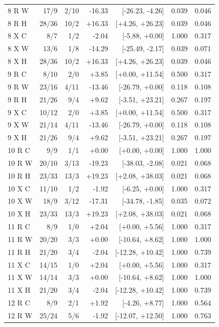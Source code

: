 \begin{longtable}{lrrrrrr}
8 R W & 17/9 & 2/10 & -16.33 & [-26.23, -4.26] & 0.039 & 0.046\\
8 R H & 28/36 & 10/2 & +16.33 & [+4.26, +26.23] & 0.039 & 0.046\\
8 X C & 8/7 & 1/2 & -2.04 & [-5.88, +0.00] & 1.000 & 0.317\\
8 X W & 13/6 & 1/8 & -14.29 & [-25.49, -2.17] & 0.039 & 0.071\\
8 X H & 28/36 & 10/2 & +16.33 & [+4.26, +26.23] & 0.039 & 0.046\\
9 R C & 8/10 & 2/0 & +3.85 & [+0.00, +11.54] & 0.500 & 0.317\\
9 R W & 23/16 & 4/11 & -13.46 & [-26.79, +0.00] & 0.118 & 0.108\\
9 R H & 21/26 & 9/4 & +9.62 & [-3.51, +23.21] & 0.267 & 0.197\\
9 X C & 10/12 & 2/0 & +3.85 & [+0.00, +11.54] & 0.500 & 0.317\\
9 X W & 21/14 & 4/11 & -13.46 & [-26.79, +0.00] & 0.118 & 0.108\\
9 X H & 21/26 & 9/4 & +9.62 & [-3.51, +23.21] & 0.267 & 0.197\\
10 R C & 9/9 & 1/1 & +0.00 & [+0.00, +0.00] & 1.000 & 1.000\\
10 R W & 20/10 & 3/13 & -19.23 & [-38.03, -2.08] & 0.021 & 0.068\\
10 R H & 23/33 & 13/3 & +19.23 & [+2.08, +38.03] & 0.021 & 0.068\\
10 X C & 11/10 & 1/2 & -1.92 & [-6.25, +0.00] & 1.000 & 0.317\\
10 X W & 18/9 & 3/12 & -17.31 & [-34.78, -1.85] & 0.035 & 0.072\\
10 X H & 23/33 & 13/3 & +19.23 & [+2.08, +38.03] & 0.021 & 0.068\\
11 R C & 8/9 & 1/0 & +2.04 & [+0.00, +5.56] & 1.000 & 0.317\\
11 R W & 20/20 & 3/3 & +0.00 & [-10.64, +8.62] & 1.000 & 1.000\\
11 R H & 21/20 & 3/4 & -2.04 & [-12.28, +10.42] & 1.000 & 0.739\\
11 X C & 14/15 & 1/0 & +2.04 & [+0.00, +5.56] & 1.000 & 0.317\\
11 X W & 14/14 & 3/3 & +0.00 & [-10.64, +8.62] & 1.000 & 1.000\\
11 X H & 21/20 & 3/4 & -2.04 & [-12.28, +10.42] & 1.000 & 0.739\\
12 R C & 8/9 & 2/1 & +1.92 & [-4.26, +8.77] & 1.000 & 0.564\\
12 R W & 25/24 & 5/6 & -1.92 & [-12.07, +12.50] & 1.000 & 0.763\\

\end{longtable}
